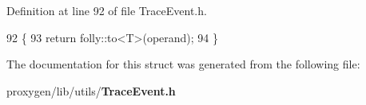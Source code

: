 Definition at line 92 of file Trace\+Event.\+h.


\begin{DoxyCode}
92                                      \{
93         \textcolor{keywordflow}{return} folly::to<T>(operand);
94       \}
\end{DoxyCode}


The documentation for this struct was generated from the following file\+:\begin{DoxyCompactItemize}
\item 
proxygen/lib/utils/{\bf Trace\+Event.\+h}\end{DoxyCompactItemize}
